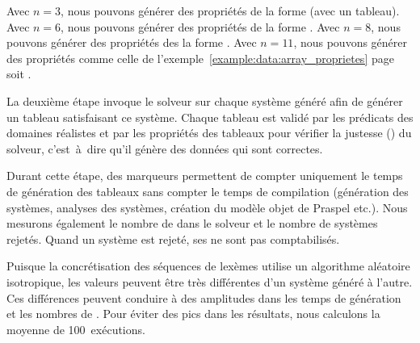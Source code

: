 Avec $n = 3$, nous pouvons générer des propriétés de la forme 
(avec  un tableau). Avec $n = 6$, nous pouvons générer des propriétés de
la forme . Avec $n = 8$, nous pouvons générer des propriétés des
la forme . Avec $n = 11$, nous pouvons générer des propriétés
comme celle de l'exemple~\ref{example:data:array_proprietes}
page~\pageref{example:data:array_proprietes} soit .

La deuxième étape invoque le solveur sur chaque système généré afin de générer
un tableau satisfaisant ce système. Chaque tableau est validé par les prédicats
des domaines réalistes et par les propriétés des tableaux pour vérifier la
justesse () du solveur, c'est~à~dire qu'il génère des
données qui sont correctes.

Durant cette étape, des marqueurs permettent de compter uniquement le temps de
génération des tableaux sans compter le temps de compilation (génération des
systèmes, analyses des systèmes, création du modèle objet de Praspel etc.). Nous
mesurons également le nombre de  dans le solveur et le
nombre de systèmes rejetés. Quand un système est rejeté, ses
 ne sont pas comptabilisés.

Puisque la concrétisation des séquences de lexèmes utilise un algorithme
aléatoire isotropique, les valeurs peuvent être très différentes d'un système
généré à l'autre. Ces différences peuvent conduire à des amplitudes dans les
temps de génération et les nombres de . Pour éviter des
pics dans les résultats, nous calculons la moyenne de 100~exécutions.

